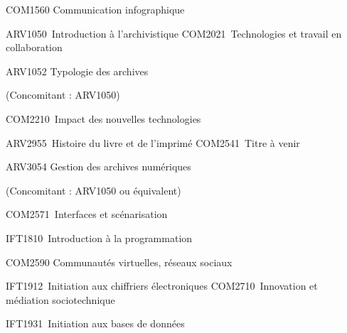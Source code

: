 \documentclass [12 pt]{article}
\begin{document}
                            
                            
                                COM1560 Communication infographique
                            
                        
                        
                            ARV1050 Introduction à l'archivistique
                            COM2021 Technologies et travail en collaboration
                        
                        
                            
                                ARV1052 Typologie des archives
                                
                                    (Concomitant : ARV1050)
                                
                            
                            COM2210 Impact des nouvelles technologies
                        
                        
                            ARV2955 Histoire du livre et de l'imprimé
                            COM2541 Titre à venir
                        
                        
                            
                                ARV3054 Gestion des archives numériques
                                
                                    (Concomitant : ARV1050 ou équivalent)
                                
                            
                            COM2571 Interfaces et scénarisation
                        
                        
                            IFT1810 Introduction à la programmation
                            
                                COM2590 Communautés virtuelles, réseaux sociaux
                            
                        
                        
                            IFT1912 Initiation aux chiffriers électroniques
                            COM2710 Innovation et médiation sociotechnique
                        
                        
                            IFT1931 Initiation aux bases de données 
                             
                        
\end{document}
